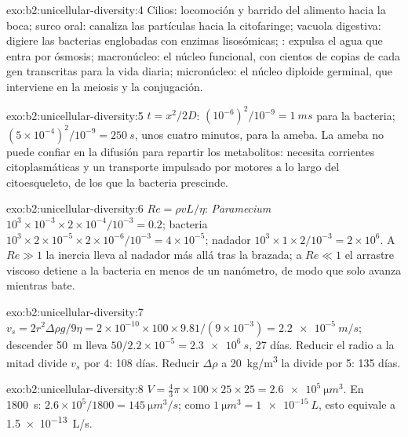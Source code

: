 \begin{solution}{exo:b2:unicellular-diversity:4}
Cilios: locomoción y barrido del alimento hacia la boca; surco oral:
canaliza las partículas hacia la citofaringe; vacuola digestiva: digiere
las bacterias englobadas con enzimas lisosómicas; :
expulsa el agua que entra por ósmosis; macronúcleo: el núcleo funcional,
con cientos de copias de cada gen transcritas para la vida diaria;
micronúcleo: el núcleo diploide germinal, que interviene en la meiosis y
la conjugación.
\end{solution}

\begin{solution}{exo:b2:unicellular-diversity:5}
$t = x^2/2D$: $(10^{-6})^2/10^{-9} = \qty{1}{ms}$ para la bacteria;
$(5\times 10^{-4})^2/10^{-9} = \qty{250}{s}$, unos cuatro minutos, para
la ameba. La ameba no puede confiar en la difusión para repartir los
metabolitos: necesita corrientes citoplasmáticas y un transporte
impulsado por motores a lo largo del citoesqueleto, de los que la
bacteria prescinde.
\end{solution}

\begin{solution}{exo:b2:unicellular-diversity:6}
$Re = \rho vL/\eta$: \emph{Paramecium} $10^3\times 10^{-3}\times
2\times 10^{-4}/10^{-3} = 0.2$; bacteria $10^3\times 2\times
10^{-5}\times 2\times 10^{-6}/10^{-3} = 4\times 10^{-5}$; nadador
$10^3\times 1\times 2/10^{-3} = 2\times 10^6$. A $Re \gg 1$ la inercia
lleva al nadador más allá tras la brazada; a $Re \ll 1$ el arrastre
viscoso detiene a la bacteria en menos de un nanómetro, de modo que solo
avanza mientras bate.
\end{solution}

\begin{solution}{exo:b2:unicellular-diversity:7}
$v_s = 2r^2\Delta\rho g/9\eta = 2\times 10^{-10}\times 100\times
9.81/(9\times 10^{-3}) = \qty{2.2e-5}{m/s}$; descender \qty{50}{m} lleva
$50/2.2\times 10^{-5} = \qty{2.3e6}{s}$, 27 días. Reducir el radio a la
mitad divide $v_s$ por 4: 108 días. Reducir $\Delta\rho$ a
\qty{20}{kg/m^3} la divide por 5: 135 días.
\end{solution}

\begin{solution}{exo:b2:unicellular-diversity:8}
$V = \tfrac{4}{3}\pi\times 100\times 25\times 25 =
\qty{2.6e5}{\micro m^3}$. En \qty{1800}{s}: $2.6\times 10^5/1800 =
\qty{145}{\micro m^3/s}$; como $\qty{1}{\micro m^3} =
\qty{1e-15}{L}$, esto equivale a \qty{1.5e-13}{L/s}.
\end{solution}

